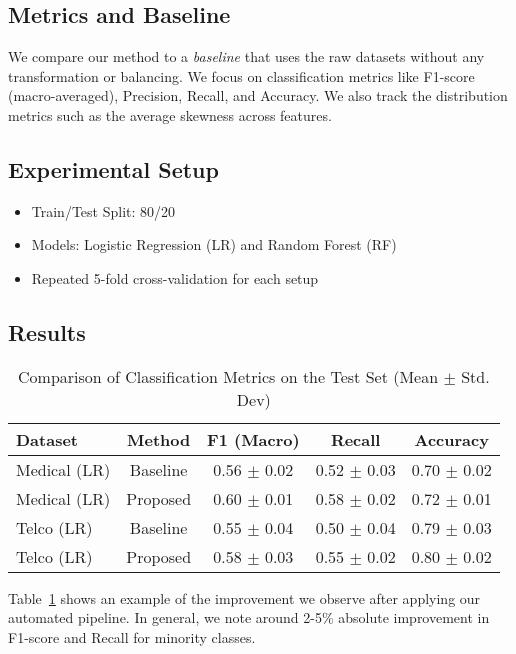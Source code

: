 \documentclass[11pt]{article}
\begin{document}
\subsection{Metrics and Baseline}
We compare our method to a \emph{baseline} that uses the raw datasets without any transformation or balancing. 
We focus on classification metrics like F1-score (macro-averaged), Precision, Recall, and Accuracy. 
We also track the distribution metrics such as the average skewness across features.

\subsection{Experimental Setup}
\begin{itemize}
    \item Train/Test Split: 80/20
    \item Models: Logistic Regression (LR) and Random Forest (RF)
    \item Repeated 5-fold cross-validation for each setup
\end{itemize}

\subsection{Results}

\begin{table}[h!]
\centering
\caption{Comparison of Classification Metrics on the Test Set (Mean $\pm$ Std. Dev)}
\label{tab:results}
\begin{tabular}{@{}lcccc@{}}
\toprule
\textbf{Dataset} & \textbf{Method} & \textbf{F1 (Macro)} & \textbf{Recall} & \textbf{Accuracy} \\ \midrule
Medical (LR)      & Baseline    & 0.56 $\pm$ 0.02 & 0.52 $\pm$ 0.03 & 0.70 $\pm$ 0.02 \\
Medical (LR)      & Proposed    & 0.60 $\pm$ 0.01 & 0.58 $\pm$ 0.02 & 0.72 $\pm$ 0.01 \\
\midrule
Telco (LR)        & Baseline    & 0.55 $\pm$ 0.04 & 0.50 $\pm$ 0.04 & 0.79 $\pm$ 0.03 \\
Telco (LR)        & Proposed    & 0.58 $\pm$ 0.03 & 0.55 $\pm$ 0.02 & 0.80 $\pm$ 0.02 \\
\midrule
\bottomrule
\end{tabular}
\end{table}

Table~\ref{tab:results} shows an example of the improvement we observe after applying our automated pipeline. 
In general, we note around 2-5\% absolute improvement in F1-score and Recall for minority classes. 
\end{document}
